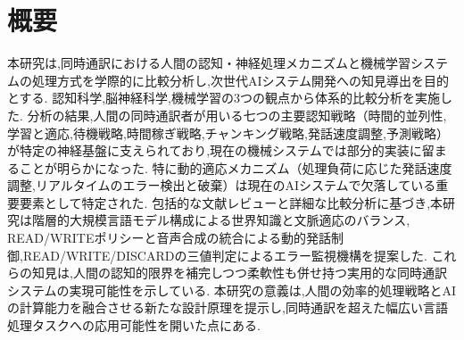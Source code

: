 \section*{概要}

本研究は,同時通訳における人間の認知・神経処理メカニズムと機械学習システムの処理方式を学際的に比較分析し,次世代AIシステム開発への知見導出を目的とする.
認知科学,脳神経科学,機械学習の3つの観点から体系的比較分析を実施した.
分析の結果,人間の同時通訳者が用いる七つの主要認知戦略（時間的並列性,学習と適応,待機戦略,時間稼ぎ戦略,チャンキング戦略,発話速度調整,予測戦略）が特定の神経基盤に支えられており,現在の機械システムでは部分的実装に留まることが明らかになった.
特に動的適応メカニズム（処理負荷に応じた発話速度調整,リアルタイムのエラー検出と破棄）は現在のAIシステムで欠落している重要要素として特定された.
包括的な文献レビューと詳細な比較分析に基づき,本研究は階層的大規模言語モデル構成による世界知識と文脈適応のバランス, READ/WRITEポリシーと音声合成の統合による動的発話制御,READ/WRITE/DISCARDの三値判定によるエラー監視機構を提案した.
これらの知見は,人間の認知的限界を補完しつつ柔軟性も併せ持つ実用的な同時通訳システムの実現可能性を示している.
本研究の意義は,人間の効率的処理戦略とAIの計算能力を融合させる新たな設計原理を提示し,同時通訳を超えた幅広い言語処理タスクへの応用可能性を開いた点にある.